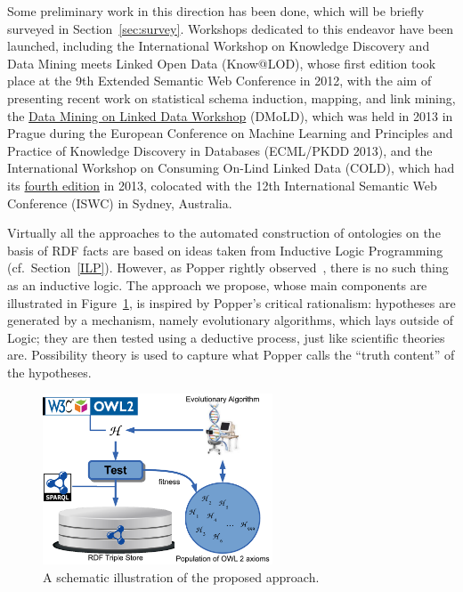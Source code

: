 \documentclass[a4paper]{article}
\begin{document}
Some preliminary work in this direction has been done, which will be briefly surveyed
in Section~\ref{sec:survey}.
Workshops dedicated to this endeavor have been launched, including
the International Workshop on Knowledge Discovery and Data Mining meets Linked Open Data
({Know@LOD}), whose first edition took place at the 9th Extended Semantic Web Conference in 2012,
with the aim of presenting recent work on statistical schema induction, mapping, and link mining,
the \href{http://keg.vse.cz/dmold2013/}{Data Mining on Linked Data Workshop} (DMoLD),
which was held in 2013 in Prague during the European Conference on Machine Learning
and Principles and Practice of Knowledge Discovery in Databases (ECML/PKDD 2013),
and the International Workshop on Consuming On-Lind Linked Data (COLD),
which had its \href{http://db.uwaterloo.ca/cold2013/}{fourth edition} in 2013,
colocated with the 12th International Semantic Web Conference (ISWC) in Sydney, Australia.

Virtually all the approaches to the automated construction of ontologies on the
basis of RDF facts are based on ideas taken from Inductive Logic Programming
(cf.\ Section~\ref{ILP}). However, as Popper rightly observed~\cite{Popper1935},
there is no such thing as an inductive logic. The approach we propose,
whose main components are illustrated in Figure~\ref{fig:synopsis}, is inspired by
Popper's critical rationalism: hypotheses are generated by a mechanism, namely
evolutionary algorithms, which lays outside of Logic; they are then tested using
a deductive process, just like scientific theories are. Possibility theory is used
to capture what Popper calls the ``truth content'' of the hypotheses.

\begin{figure}
  \begin{center}
    \includegraphics[height=2in]{synopsis}
  \end{center}
  \caption{A schematic illustration of the proposed approach.\label{fig:synopsis}}
\end{figure}
\end{document}
